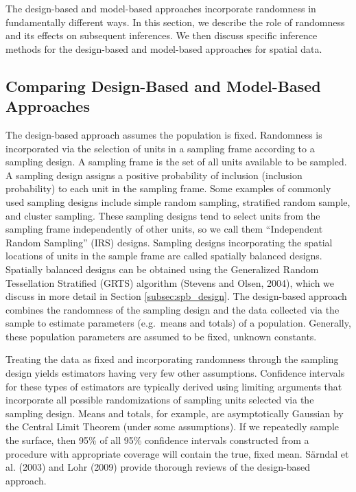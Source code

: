 \documentclass[]{elsarticle} %
\begin{document}
The design-based and model-based approaches incorporate randomness in
fundamentally different ways. In this section, we describe the role of
randomness and its effects on subsequent inferences. We then discuss
specific inference methods for the design-based and model-based
approaches for spatial data.

\hypertarget{subsec:dvm_compare}{%
\subsection{Comparing Design-Based and Model-Based
Approaches}\label{subsec:dvm_compare}}

The design-based approach assumes the population is fixed. Randomness is
incorporated via the selection of units in a sampling frame according to
a sampling design. A sampling frame is the set of all units available to
be sampled. A sampling design assigns a positive probability of
inclusion (inclusion probability) to each unit in the sampling frame.
Some examples of commonly used sampling designs include simple random
sampling, stratified random sample, and cluster sampling. These sampling
designs tend to select units from the sampling frame independently of
other units, so we call them ``Independent Random Sampling'' (IRS)
designs. Sampling designs incorporating the spatial locations of units
in the sample frame are called spatially balanced designs. Spatially
balanced designs can be obtained using the Generalized Random
Tessellation Stratified (GRTS) algorithm (Stevens and Olsen, 2004),
which we discuss in more detail in Section \ref{subsec:spb_design}. The
design-based approach combines the randomness of the sampling design and
the data collected via the sample to estimate parameters (e.g.~means and
totals) of a population. Generally, these population parameters are
assumed to be fixed, unknown constants.

Treating the data as fixed and incorporating randomness through the
sampling design yields estimators having very few other assumptions.
Confidence intervals for these types of estimators are typically derived
using limiting arguments that incorporate all possible randomizations of
sampling units selected via the sampling design. Means and totals, for
example, are asymptotically Gaussian by the Central Limit Theorem (under
some assumptions). If we repeatedly sample the surface, then 95\% of all
95\% confidence intervals constructed from a procedure with appropriate
coverage will contain the true, fixed mean. Särndal et al. (2003) and
Lohr (2009) provide thorough reviews of the design-based approach.
\end{document}
